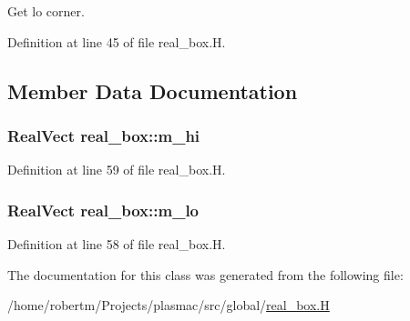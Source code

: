 Get lo corner. 



Definition at line 45 of file real\+\_\+box.\+H.



\subsection{Member Data Documentation}
\subsubsection[{\texorpdfstring{m\+\_\+hi}{m_hi}}]{\setlength{\rightskip}{0pt plus 5cm}Real\+Vect real\+\_\+box\+::m\+\_\+hi\hspace{0.3cm}{\ttfamily [protected]}}\hypertarget{classreal__box_a8d01d81288f03d4294f37525dec2c9f0}{}\label{classreal__box_a8d01d81288f03d4294f37525dec2c9f0}


Definition at line 59 of file real\+\_\+box.\+H.

\subsubsection[{\texorpdfstring{m\+\_\+lo}{m_lo}}]{\setlength{\rightskip}{0pt plus 5cm}Real\+Vect real\+\_\+box\+::m\+\_\+lo\hspace{0.3cm}{\ttfamily [protected]}}\hypertarget{classreal__box_a4c5a2922df1481943abb6978f37661e1}{}\label{classreal__box_a4c5a2922df1481943abb6978f37661e1}


Definition at line 58 of file real\+\_\+box.\+H.



The documentation for this class was generated from the following file\+:\begin{DoxyCompactItemize}
\item 
/home/robertm/\+Projects/plasmac/src/global/\hyperlink{real__box_8H}{real\+\_\+box.\+H}\end{DoxyCompactItemize}
